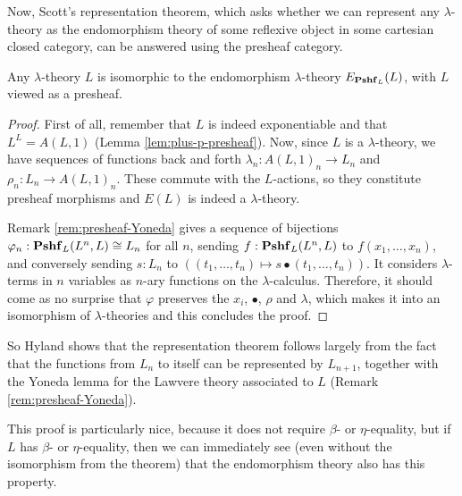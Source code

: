 Now, Scott's representation theorem, which asks whether we can represent any $ \lambda $-theory as the endomorphism theory of some reflexive object in some cartesian closed category, can be answered using the presheaf category.
\begin{theorem}\label{thm:representation-theorem}
  Any $ \lambda $-theory $ L $ is isomorphic to the endomorphism $ \lambda $-theory $ E_{\mathbf{Pshf}_{L}}(L) $, with $ L $ viewed as a presheaf.
\end{theorem}
\begin{proof}
  First of all, remember that $ L $ is indeed exponentiable and that $ L^L = A(L, 1) $ (Lemma \ref{lem:plus-p-presheaf}).
  Now, since $ L $ is a $ \lambda $-theory, we have sequences of functions back and forth $ \lambda_n: A(L, 1)_n \to L_n $ and $ \rho_n: L_n \to A(L, 1)_n $. These commute with the $ L $-actions, so they constitute presheaf morphisms and $ E(L) $ is indeed a $ \lambda $-theory.

  Remark \ref{rem:presheaf-Yoneda} gives a sequence of bijections $ \varphi_n : \mathbf{Pshf}_{L}(L^n, L) \cong L_n $ for all $ n $, sending $ f: \mathbf{Pshf}_{L}(L^n, L) $ to $ f(x_1, \dots, x_n) $, and conversely sending $ s: L_n $ to $ ((t_1, \dots, t_n) \mapsto s \bullet (t_1, \dots, t_n)) $. It considers $ \lambda $-terms in $ n $ variables as $ n $-ary functions on the $ \lambda $-calculus. Therefore, it should come as no surprise that $ \varphi $ preserves the $ x_i $, $ \bullet $, $ \rho $ and $ \lambda $, which makes it into an isomorphism of $ \lambda $-theories and this concludes the proof.
\end{proof}
So Hyland shows that the representation theorem follows largely from the fact that the functions from $ L_n $ to itself can be represented by $ L_{n + 1} $, together with the Yoneda lemma for the Lawvere theory associated to $ L $ (Remark \ref{rem:presheaf-Yoneda}).

This proof is particularly nice, because it does not require $ \beta $- or $ \eta $-equality, but if $ L $ has $ \beta $- or $ \eta $-equality, then we can immediately see (even without the isomorphism from the theorem) that the endomorphism theory also has this property.

